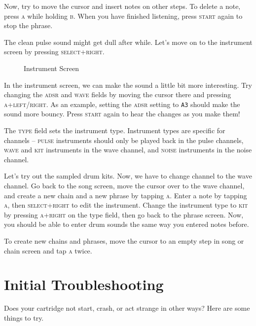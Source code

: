 Now, try to move the cursor and insert notes on other steps.
To delete a note, press \textsc{a} while holding \textsc{b}.
When you have finished listening, press \textsc{start} again to stop the phrase.

The clean pulse sound might get dull after while. Let's move on to the instrument
screen by pressing \textsc{select+right}.

\begin{figure}[hbtp]
\centering
{}
\caption{Instrument Screen}
\label{fig:instr}
\end{figure}

In the instrument screen, we can make the sound a little bit more interesting.
Try changing the \textsc{adsr} and \textsc{wave} fields by moving the cursor there and pressing \textsc{a+left/right}.
As an example, setting the \textsc{adsr} setting to \texttt{A3} should make the sound more bouncy.
Press \textsc{start} again to hear the changes as you make them!

The \textsc{type} field sets the instrument type. Instrument types are specific for
channels -- \textsc{pulse} instruments should only be played back in the pulse channels, \textsc{wave} and \textsc{kit}
instruments in the wave channel, and \textsc{noise} instruments in the noise channel.

Let's try out the sampled drum kits. Now, we have to change channel to the wave channel.
Go back to the song screen, move the cursor over to the wave channel, and create a new
chain and a new phrase by tapping \textsc{a}.
Enter a note by tapping \textsc{a}, then \textsc{select+right} to edit the instrument.
Change the instrument type to \textsc{kit} by pressing \textsc{a+right} on the type field,
then go back to the phrase screen. Now, you should be able to enter drum sounds the same way
you entered notes before.

To create new chains and phrases, move the cursor to an empty step in song or chain screen and tap \textsc{a} twice.

\section{Initial Troubleshooting}

Does your cartridge not start, crash, or act strange in other ways? Here are some things to try.

